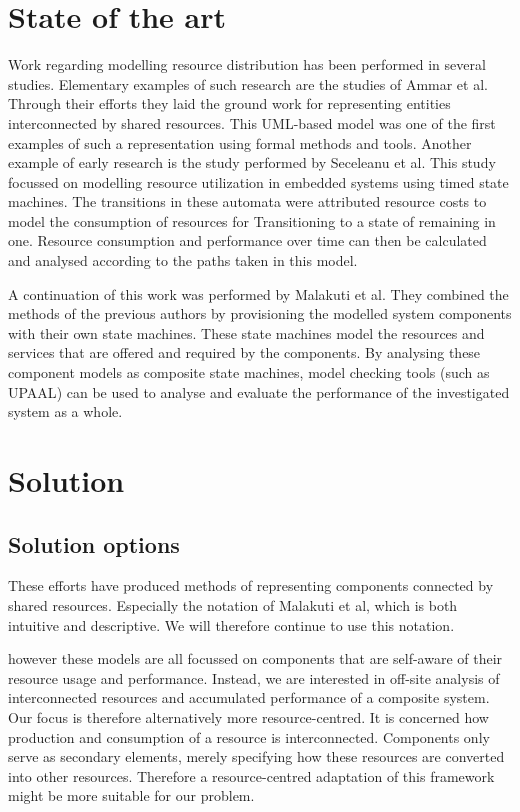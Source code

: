 \section{State of the art}
Work regarding modelling resource distribution has been performed in several studies. Elementary examples of such research are the studies of Ammar et al\cite{rum_basis_2}. Through their efforts they laid the ground work for representing entities interconnected by shared resources. This UML-based model was one of the first examples of such a representation using formal methods and tools. Another example of early research is the study performed by Seceleanu et al\cite{rum_basis_89}. This study focussed on modelling resource utilization in embedded systems using timed state machines. The transitions in these automata were attributed resource costs to model the consumption of resources for Transitioning to a state of remaining in one. Resource consumption and performance over time  can then be calculated and analysed according to the paths taken in this model.

A continuation of this work was performed by Malakuti et al\cite{steven-te-brinke}. They combined the methods of the previous authors by provisioning the modelled system components with their own state machines. These state machines model the resources and services that are offered and required by the components. By analysing these component models as composite state machines, model checking tools (such as UPAAL\cite{web:upaal}) can be used to analyse and evaluate the performance of the investigated system as a whole.

\section{Solution}
\subsection{Solution options}
These efforts have produced methods of representing components connected by shared resources. Especially the notation of Malakuti et al\cite{steven-te-brinke}, which is both intuitive and descriptive. We will therefore continue to use this notation.

however these models are all focussed on components that are self-aware of their resource usage and performance. Instead, we are interested in off-site analysis of interconnected resources and accumulated performance of a composite system. Our focus is therefore alternatively more resource-centred. It is concerned how production and consumption of a resource is interconnected. Components only serve as secondary elements, merely specifying how these resources are converted into other resources. Therefore a resource-centred adaptation of this framework might be more suitable for our problem.

